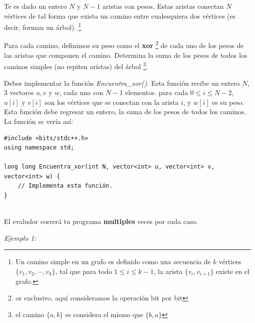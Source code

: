 \documentclass[12pt]{scrartcl}
\begin{document}
    
    
    \vspace{10pt}

    
    
        Te es dado un entero $N$ y $N - 1$ aristas con pesos. Estas aristas conectan $N$ vértices de tal forma que exista un camino entre cualesquiera dos vértices (es decir, forman un árbol).
        \footnote{Un camino simple en un grafo es definido como una secuencia de $k$ vértices $\{v_1, v_2, \cdots , v_k\}$, tal que para todo $1 \le i \le k - 1$, la arista $\{v_i, v_{i + 1}\}$ existe en el grafo. }
        
        Para cada camino, definimos su peso como el {\bfseries xor} \footnote{or exclusivo, aquí consideramos la operación bit por bit} de cada uno de los pesos de las aristas que componen el camino. Determina la suma de los pesos de todos los caminos simples (no repiten aristas) del árbol \footnote{el camino $\{a, b\}$ se considera el mismo que $\{b, a\}$}.
        

        Debes implementar la función \textit{Encuentra\_xor()}. Esta función recibe un entero $N$, 3 vectores $u, v$ y $w$, cada uno con $N - 1$ elementos. para cada $0 \le i \le N - 2$, $u[i]$ y $v[i]$ son los vértices que se conectan con la arista $i$, y $w[i]$ es su peso. Esta función debe regresar un entero, la suma de los pesos de todos los caminos.
        La función se vería así:

\begin{verbatim}
#include <bits/stdc++.h>
using namespace std;

long long Encuentra_xor(int N, vector<int> u, vector<int> v, vector<int> w) {
    // Implementa esta función.
}
    
\end{verbatim}

    El evaludor correrá tu programa \textbf{multiples} veces por cada caso.


               
        {\itshape Ejemplo 1:}
        
\end{document}
